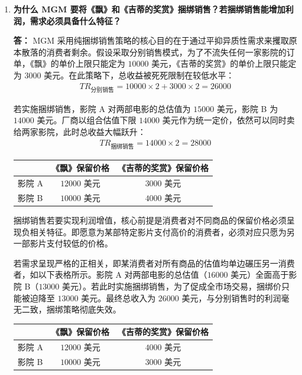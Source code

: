 \begin{enumerate}[label=\textbf{\arabic*.}, leftmargin=*]
		\item \textbf{为什么 MGM 要将《飘》和《吉蒂的奖赏》捆绑销售？若捆绑销售能增加利润，需求必须具备什么特征？}
		
		\textbf{答：}
		MGM 采用纯捆绑销售策略的核心目的在于通过平抑异质性需求来攫取原本散落的消费者剩余。假设采取分别销售模式，为了不流失任何一家影院的订单，《飘》的单价上限只能定为 $10000$ 美元，《吉蒂的奖赏》的单价上限只能定为 $3000$ 美元。在此策略下，总收益被死死限制在较低水平：
		\[
		\begin{aligned}
			TR_{\text{分别销售}} = 10000 \times 2 + 3000 \times 2 = 26000
		\end{aligned}
		\]
		
		若实施捆绑销售，影院 A 对两部电影的总估值为 $15000$ 美元，影院 B 为 $14000$ 美元。厂商以组合估值下限 $14000$ 美元作为统一定价，依然可以同时卖给两家影院，此时总收益大幅跃升：
		\[
		\begin{aligned}
			TR_{\text{捆绑销售}} = 14000 \times 2 = 28000
		\end{aligned}
		\]
		
		\begin{center}
			\begin{tabular}{lcc}
				\hline
				& 《飘》保留价格 & 《吉蒂的奖赏》保留价格 \\
				\hline
				影院 A & $12000$ 美元 & $3000$ 美元 \\
				影院 B & $10000$ 美元 & $4000$ 美元 \\
				\hline
			\end{tabular}
		\end{center}
		
		捆绑销售若要实现利润增值，核心前提是消费者对不同商品的保留价格必须呈现负相关特征。即愿意为某部特定影片支付高价的消费者，必须对应只愿为另一部影片支付较低的价格。
		
		若需求呈现严格的正相关，即某消费者对所有商品的估值均单边碾压另一消费者，如以下表格所示。影院 A 对两部电影的总估值（$16000$ 美元）全面高于影院 B（$13000$ 美元）。若此时实施捆绑销售，为了促成全市场交易，捆绑价只能被迫降至 $13000$ 美元。最终总收入为 $26000$ 美元，与分别销售时的利润毫无二致，捆绑策略彻底失效。
		
		\begin{center}
			\begin{tabular}{lcc}
				\hline
				& 《飘》保留价格 & 《吉蒂的奖赏》保留价格 \\
				\hline
				影院 A & $12000$ 美元 & $4000$ 美元 \\
				影院 B & $10000$ 美元 & $3000$ 美元 \\
				\hline
			\end{tabular}
		\end{center}
		

\end{enumerate}
